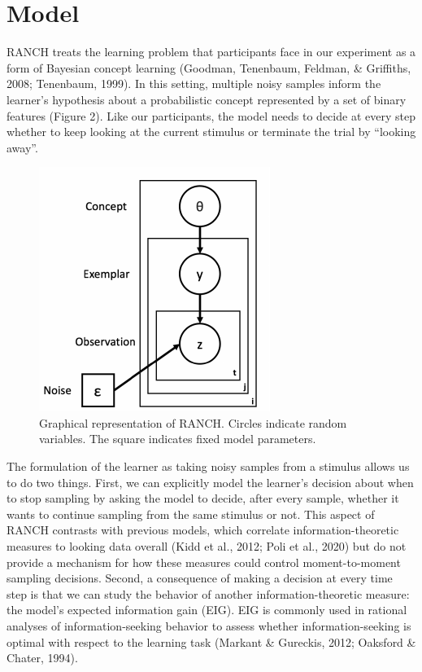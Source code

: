 \documentclass[10pt, letterpaper]{article}
\newenvironment{CodeChunk}{}{}
\begin{document}
\hypertarget{model}{%
\section{Model}\label{model}}

RANCH treats the learning problem that participants face in our
experiment as a form of Bayesian concept learning (Goodman, Tenenbaum,
Feldman, \& Griffiths, 2008; Tenenbaum, 1999). In this setting, multiple
noisy samples inform the learner's hypothesis about a probabilistic
concept represented by a set of binary features (Figure 2). Like our
participants, the model needs to decide at every step whether to keep
looking at the current stimulus or terminate the trial by ``looking
away''.

\begin{CodeChunk}
\begin{figure}[H]

{\centering \includegraphics{figs/plate_diagram-1} 

}

\caption[Graphical representation of RANCH]{Graphical representation of RANCH. Circles indicate random variables. The square indicates fixed model parameters.}\label{fig:plate_diagram}
\end{figure}
\end{CodeChunk}

The formulation of the learner as taking noisy samples from a stimulus
allows us to do two things. First, we can explicitly model the learner's
decision about when to stop sampling by asking the model to decide,
after every sample, whether it wants to continue sampling from the same
stimulus or not. This aspect of RANCH contrasts with previous models,
which correlate information-theoretic measures to looking data overall
(Kidd et al., 2012; Poli et al., 2020) but do not provide a mechanism
for how these measures could control moment-to-moment sampling
decisions. Second, a consequence of making a decision at every time step
is that we can study the behavior of another information-theoretic
measure: the model's expected information gain (EIG). EIG is commonly
used in rational analyses of information-seeking behavior to assess
whether information-seeking is optimal with respect to the learning task
(Markant \& Gureckis, 2012; Oaksford \& Chater, 1994).
\end{document}
